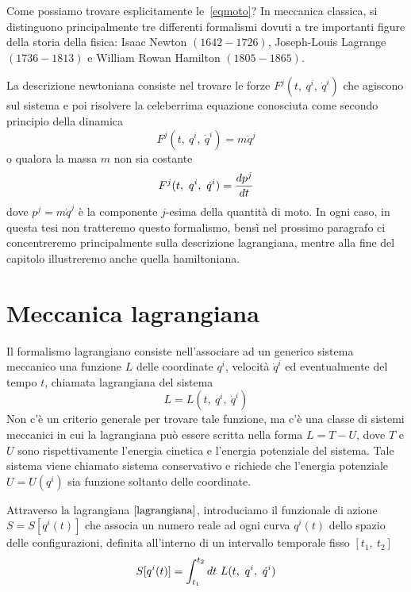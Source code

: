     Come possiamo trovare esplicitamente le~\eqref{eqmoto}? In meccanica classica, si distinguono principalmente tre differenti formalismi dovuti a tre importanti figure della storia della fisica: Isaac Newton $(1642-1726)$, Joseph-Louis Lagrange $(1736-1813)$ e William Rowan Hamilton $(1805-1865)$. 

    La descrizione newtoniana consiste nel trovare le forze $F^j(t, ~q^i, ~ \dot q^i)$ che agiscono sul sistema e poi risolvere la celeberrima equazione conosciuta come secondo principio della dinamica
    \begin{equation*}
        F^j(t, ~q^i, ~ \dot q^i) = m \ddot q^j
    \end{equation*}
    o qualora la massa $m$ non sia costante 
    \begin{equation*}
        F^j(t, ~q^i, ~ \dot q^i) = \frac{dp^j}{dt}
    \end{equation*}
    dove $p^j = m \dot q^j$ è la componente $j$-esima della quantità di moto. In ogni caso, in questa tesi non tratteremo questo formalismo, bensì nel prossimo paragrafo ci concentreremo principalmente sulla descrizione lagrangiana, mentre alla fine del capitolo illustreremo anche quella hamiltoniana.
    
\section{Meccanica lagrangiana}

    Il formalismo lagrangiano consiste nell'associare ad un generico sistema meccanico una funzione $L$ delle coordinate $q^i$, velocità $\dot q^i$ ed eventualmente del tempo $t$, chiamata lagrangiana del sistema
    \begin{equation} \label{lagrangiana}
        L = L(t, ~q^i, ~\dot q^i) 
    \end{equation}  
    Non c'è un criterio generale per trovare tale funzione, ma c'è una classe di sistemi meccanici in cui la lagrangiana può essere scritta nella forma $L = T - U$, dove $T$ e $U$ sono rispettivamente l'energia cinetica e l'energia potenziale del sistema. Tale sistema viene chiamato sistema conservativo e richiede che l'energia potenziale $U = U(q^i)$ sia funzione soltanto delle coordinate.
    
    Attraverso la lagrangiana $\eqref{lagrangiana}$, introduciamo il funzionale di azione $S = S[q^i(t)]$ che associa un numero reale ad ogni curva $q^i(t)$ dello spazio delle configurazioni, definita all'interno di un intervallo temporale fisso $[t_1, ~t_2]$
    \begin{equation} \label{azione}
        S[q^i(t)] = \int_{t_1}^{t_2}dt~ L(t, ~q^i, ~\dot q^i)
    \end{equation}

